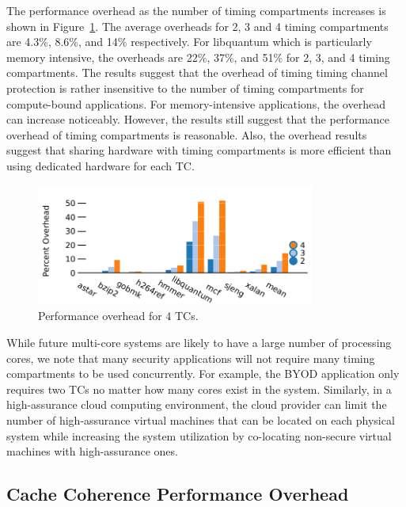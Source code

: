 The performance overhead as the number of timing compartments increases is 
shown in Figure~\ref{fig:scalability}. The average overheads %
for 2, 3 and 4 timing compartments are 4.3\%, 8.6\%, and 14\% 
respectively. For libquantum which is particularly memory intensive, the 
overheads are 22\%, 37\%, and 51\% for 2, 3, and 4 timing compartments. The 
results suggest that the overhead of timing timing channel protection is rather 
insensitive to the number of timing compartments for compute-bound 
applications. For memory-intensive applications, the overhead can increase 
noticeably. However, the results still suggest that the performance overhead
of timing compartments is reasonable. Also, the overhead results suggest
that sharing hardware with timing compartments is more efficient than
using dedicated hardware for each TC.

\begin{figure}
    \begin{center}
        \includegraphics[width=3.6in]{figs/scalability.pdf}
        \caption{Performance overhead for 4 TCs.}
        \label{fig:scalability}
    \end{center}
\end{figure}

While future multi-core systems are likely to have a large number of processing 
cores, we note that many security applications will not require many timing 
compartments to be used concurrently. For example, the BYOD application only 
requires two TCs no matter how many cores exist in the system. Similarly, in a 
high-assurance cloud computing environment, the cloud provider can limit the
number of high-assurance virtual machines that can be located on each physical
system while increasing the system utilization by co-locating non-secure
virtual machines with high-assurance ones.

\subsection{Cache Coherence Performance Overhead}

